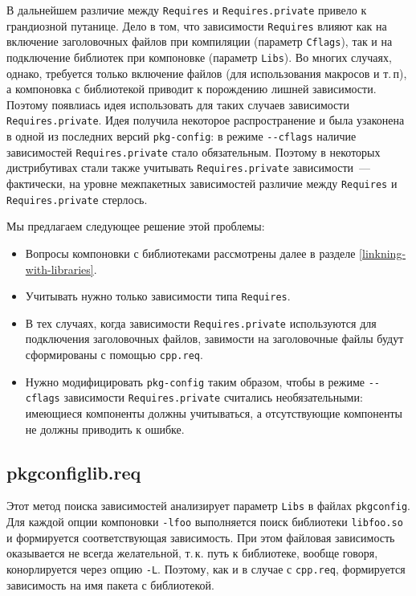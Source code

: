 \documentclass[russian,a4paper,12pt,titlepage]{article}
\begin{document}
В дальнейшем различие между \verb|Requires| и \verb|Requires.private| привело к грандиозной путанице.
Дело в том, что зависимости \verb|Requires| влияют как на включение заголовочных файлов при компиляции (параметр \verb|Cflags|),
так и на подключение библиотек при компоновке (параметр \verb|Libs|).  Во многих случаях, однако, требуется только
включение файлов (для использования макросов и т.\,п), а компоновка с библиотекой приводит к порождению лишней зависимости.
Поэтому появлиась идея использовать для таких случаев зависимости \verb|Requires.private|.
Идея получила некоторое распространение и была узаконена в одной из последних версий \verb|pkg-config|: в режиме
\verb|--cflags| наличие зависимостей \verb|Requires.private| стало обязательным.  Поэтому в некоторых дистрибутивах
стали также учитывать \verb|Requires.private| зависимости~--- фактически, на уровне межпакетных зависимостей различие
между \verb|Requires| и \verb|Requires.private| стерлось.

Мы предлагаем следующее решение этой проблемы:
\begin{itemize}
\item Вопросы компоновки с библиотеками рассмотрены далее в разделе \ref{linkning-with-libraries}.
\item Учитывать нужно только зависимости типа \verb|Requires|.
\item В тех случаях, когда зависимости \verb|Requires.private| используются для подключения заголовочных файлов,
завимости на заголовочные файлы будут сформированы с помощью \verb|cpp.req|.
\item Нужно модифицировать \verb|pkg-config| таким образом, чтобы в режиме \verb|--cflags| зависимости
\verb|Requires.private| считались необязательными: имеющиеся компоненты должны учитываться, а отсутствующие
компоненты не должны приводить к ошибке.
\end{itemize}

\subsection{pkgconfiglib.req}
Этот метод поиска зависимостей анализирует параметр \verb|Libs| в файлах \verb|pkgconfig|.
Для каждой опции компоновки \verb|-lfoo| выполняется поиск библиотеки \verb|libfoo.so| и формируется соответствующая зависимость.
При этом файловая зависимость оказывается не всегда желательной, т.\,к. путь к библиотеке, вообще говоря,
конорлируется через опцию \verb|-L|.  Поэтому, как и в случае с \verb|cpp.req|, формируется зависимость на
имя пакета с библиотекой.
\end{document}
